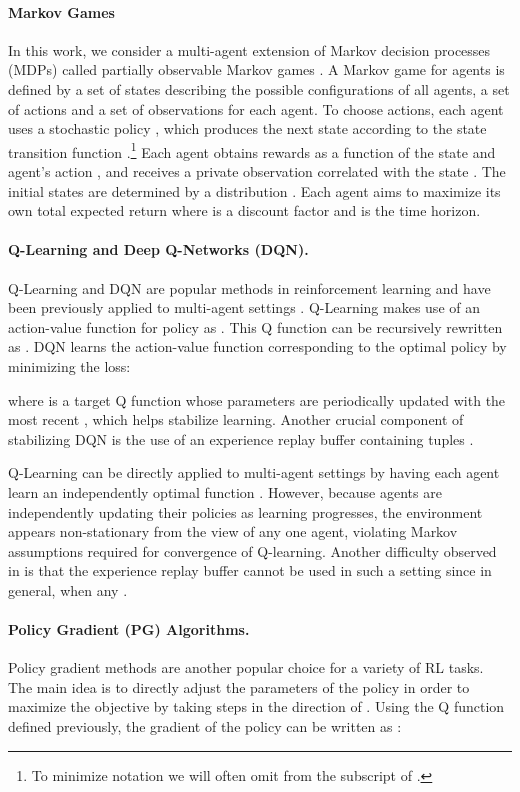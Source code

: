 \documentclass{article}
\begin{document}
\paragraph{Markov Games}
In this work, we consider a multi-agent extension of Markov decision processes (MDPs) called partially observable Markov games \cite{littman1994markov}. A Markov game for  agents is defined by a set of states  describing the possible configurations of all agents, a set of actions  and a set of observations  for each agent. To choose actions, each agent  uses a stochastic policy , which produces the next state according to the state transition function .\footnote{To minimize notation we will often omit  from the subscript of .} 
Each agent  obtains rewards as a function of the state and agent's action , and receives a private observation correlated with the state . The initial states are determined by a distribution . Each agent  aims to maximize its own total expected return  where  is a discount factor and  is the time horizon.




\paragraph{Q-Learning and Deep Q-Networks (DQN).}
Q-Learning and DQN \cite{mnih2015human} are popular methods in reinforcement learning and have been previously applied to multi-agent settings \cite{foerster16b,hyper_q}. Q-Learning makes use of an action-value function for policy  as .
This Q function can be recursively rewritten as . DQN learns the action-value function  corresponding to the optimal policy by minimizing the loss:

where  is a target Q function whose parameters are periodically updated with the most recent , which helps stabilize learning. Another crucial component of stabilizing DQN is the use of an experience replay buffer  containing tuples .

Q-Learning can be directly applied to multi-agent settings by having each agent  learn an independently optimal function  \cite{tan93multi}. However, because agents are independently updating their policies as learning progresses, the environment appears non-stationary from the view of any one agent, violating Markov assumptions required for convergence of Q-learning. Another difficulty observed in \cite{foerster_nonstat} is that the experience replay buffer cannot be used in such a setting since in general,  when any .


\paragraph{Policy Gradient (PG) Algorithms.} Policy gradient methods are another popular choice for a variety of RL tasks.
The main idea is to directly adjust the parameters  of the policy in order to maximize the objective  by taking steps in the direction of . Using the Q function defined previously, the gradient of the policy can be written as \cite{sutton2000policy}:
\end{document}
